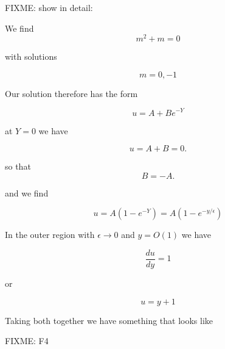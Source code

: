 FIXME: show in detail:

We find
\begin{equation}\label{eqn:continuumL20:n}
m^2 + m = 0
\end{equation}

with solutions

\begin{equation}\label{eqn:continuumL20:n}
m = 0, -1
\end{equation}

Our solution therefore has the form

\begin{equation}\label{eqn:continuumL20:n}
u = A + B e^{-Y}
\end{equation}

at $Y = 0$ we have

\begin{equation}\label{eqn:continuumL20:n}
u = A + B = 0.
\end{equation}

so that 
\begin{equation}\label{eqn:continuumL20:n}
B = -A.
\end{equation}

and we find

\begin{equation}\label{eqn:continuumL20:n}
u = A (1 - e^{-Y}) = A( 1 - e^{-y/\epsilon} )
\end{equation}

In the outer region with $\epsilon \rightarrow 0$ and $y = O(1)$ we have

\begin{equation}\label{eqn:continuumL20:n}
\frac{du}{dy} = 1
\end{equation}

or 

\begin{equation}\label{eqn:continuumL20:n}
u = y + 1
\end{equation}

Taking both together we have something that looks like

FIXME: F4


\EndNoBibArticle
